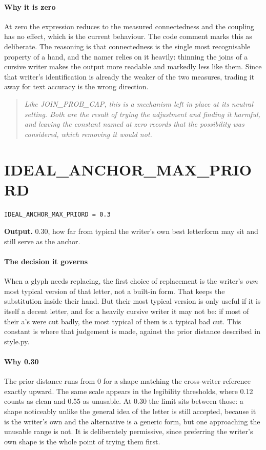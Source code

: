 \paragraph{Why it is zero}
At zero the expression reduces to the measured connectedness and the coupling has no effect, which is the current behaviour. The code comment marks this as deliberate. The reasoning is that connectedness is the single most recognisable property of a hand, and the namer relies on it heavily: thinning the joins of a cursive writer makes the output more readable and markedly less like them. Since that writer's identification is already the weaker of the two measures, trading it away for text accuracy is the wrong direction.


\begin{quote}\small\itshape Like JOIN\_PROB\_CAP, this is a mechanism left in place at its neutral setting. Both are the result of trying the adjustment and finding it harmful, and leaving the constant named at zero records that the possibility was considered, which removing it would not.\end{quote}

\section{IDEAL\_ANCHOR\_MAX\_PRIORD}
\begin{lstlisting}[style=sig]
IDEAL_ANCHOR_MAX_PRIORD = 0.3
\end{lstlisting}

\noindent\textbf{Output.} 0.30, how far from typical the writer's own best letterform may sit and still serve as the anchor.


\paragraph{The decision it governs}
When a glyph needs replacing, the first choice of replacement is the writer's \emph{own} most typical version of that letter, not a built-in form. That keeps the substitution inside their hand. But their most typical version is only useful if it is itself a decent letter, and for a heavily cursive writer it may not be: if most of their a's were cut badly, the most typical of them is a typical bad cut. This constant is where that judgement is made, against the prior distance described in style.py.


\paragraph{Why 0.30}
The prior distance runs from 0 for a shape matching the cross-writer reference exactly upward. The same scale appears in the legibility thresholds, where 0.12 counts as clean and 0.55 as unusable. At 0.30 the limit sits between those: a shape noticeably unlike the general idea of the letter is still accepted, because it is the writer's own and the alternative is a generic form, but one approaching the unusable range is not. It is deliberately permissive, since preferring the writer's own shape is the whole point of trying them first.


